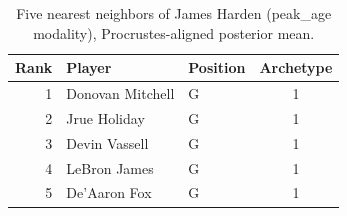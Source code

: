 \begin{table}[htbp]
  \centering\small
  \begin{tabular}{rllc}
    \toprule
    Rank & Player & Position & Archetype \\
    \midrule
    1 & Donovan Mitchell & G & 1 \\
    2 & Jrue Holiday & G & 1 \\
    3 & Devin Vassell & G & 1 \\
    4 & LeBron James & G & 1 \\
    5 & De'Aaron Fox & G & 1 \\
    \bottomrule
  \end{tabular}
  \caption{Five nearest neighbors of James Harden (peak_age modality), Procrustes-aligned posterior mean.}
  \label{tab:James_Harden_neighbors_peak_age}
\end{table}

